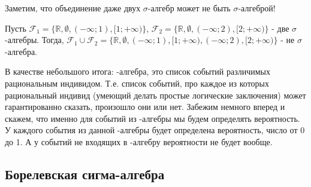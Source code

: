 {Заметим, что объединение даже двух $\sigma$-алгебр может не быть $\sigma$-алгеброй!

\begin{myex} Пусть $\mathcal{F}_{1}=\{\mathbb{R},\emptyset,(-\infty;1),[1;+\infty)\}$, $\mathcal{F}_{2}=\{\mathbb{R},\emptyset,(-\infty;2),[2;+\infty)\}$ - две $\sigma$-алгебры. Тогда, $\mathcal{F}_{1}\cup \mathcal{F}_{2}=\{\mathbb{R},\emptyset,(-\infty;1),[1;+\infty),(-\infty;2),[2;+\infty)\}$ - не $\sigma$-алгебра.
\end{myex}


В качестве небольшого итога: \s-алгебра, это список событий различимых рациональным индивидом. Т.е. список событий, про каждое из которых рациональный индивид (умеющий делать простые логические заключения) может гарантированно сказать, произошло они или нет. Забежим немного вперед и скажем, что именно для событий из \s-алгебры мы будем определять вероятность. У каждого события из данной \s-алгебры \F будет определена вероятность, число от 0 до 1. А у событий не входящих в \s-алгебру \F вероятности не будет вообще.







}\subsection{Борелевская сигма-алгебра} 
